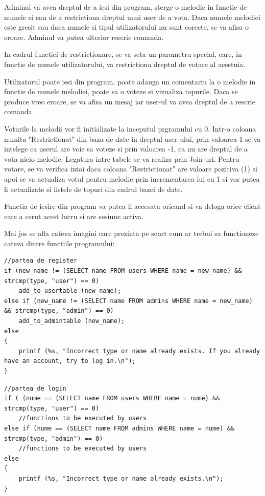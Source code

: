 \documentclass[a4paper]{article}
\begin{document}
Adminul va avea dreptul de a iesi din program, sterge o melodie in functie de numele ei sau de a restrictiona dreptul unui user de a vota. Daca numele melodiei este gresit sau daca numele si tipul utilizatorului nu sunt corecte, se va afisa o eroare. Adminul va putea ulterior rescrie comanda. 

In cadrul functiei de restrictionare, se va seta un parametru special, care, in functie de numele utilizatorului, va restrictiona dreptul de votare al acestuia. 

Utilizatorul poate iesi din program, poate adauga un comentariu la o melodie in functie de numele melodiei, poate sa o voteze si vizualiza topurile. Daca se produce vreo eroare, se va afisa un mesaj iar user-ul va avea dreptul de a rescrie comanda. 

Voturile la melodii vor fi initializate la inceputul prgramului cu 0. Intr-o coloana numita "Restrictionat" din baza de date in dreptul user-ului, prin valoarea 1 se va intelege ca userul are voie sa voteze si prin valoarea -1, ca nu are dreptul de a vota nicio melodie. Legatura intre tabele se va realiza prin Join-uri. Pentru votare, se va verifica intai daca coloana "Restrictionat" are valoare pozitiva (1) si apoi se va actualiza votul pentru melodie prin incrementarea lui cu 1 si vor putea fi actualizate si listele de topuri din cadrul bazei de date. 

Functia de iesire din program va putea fi accesata oricand si va deloga orice client care a cerut acest lucru si are sesiune activa.

Mai jos se afla cateva imagini care prezinta pe scurt cum ar trebui sa functioneze cateva dintre functiile programului:

\begin{lstlisting}[style=CStyle]
//partea de register
if (new_name != (SELECT name FROM users WHERE name = new_name) && strcmp(type, "user") == 0)
	add_to_usertable (new_name);
else if (new_name != (SELECT name FROM admins WHERE name = new_name) && strcmp(type, "admin") == 0)
	add_to_admintable (new_name);
else 
{
	printf (%s, "Incorrect type or name already exists. If you already have an account, try to log in.\n");
}
\end{lstlisting}

\begin{lstlisting}[style=CStyle]
//partea de login
if ( (nume == (SELECT name FROM users WHERE name = nume) && strcmp(type, "user") == 0) 
	//functions to be executed by users
else if (nume == (SELECT name FROM admins WHERE name = nume) &&  strcmp(type, "admin") == 0)
	//functions to be executed by users
else 
{
	printf (%s, "Incorrect type or name already exists.\n");
}
\end{lstlisting}
\end{document}
